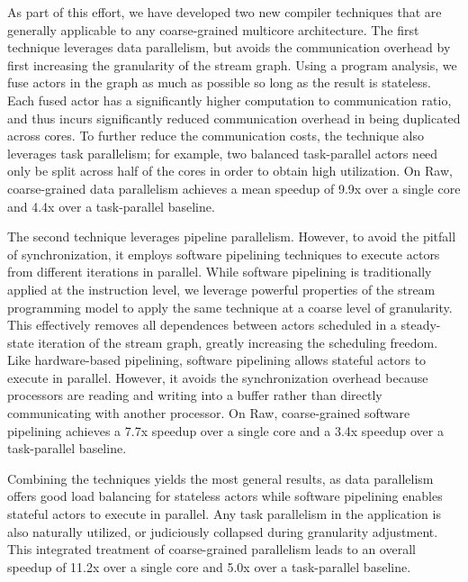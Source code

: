 As part of this effort, we have developed two new compiler techniques
that are generally applicable to any coarse-grained multicore
architecture.  The first technique leverages data parallelism, but
avoids the communication overhead by first increasing the granularity
of the stream graph.  Using a program analysis, we fuse actors in the
graph as much as possible so long as the result is stateless.  Each
fused actor has a significantly higher computation to communication
ratio, and thus incurs significantly reduced communication overhead in
being duplicated across cores.  To further reduce the communication
costs, the technique also leverages task parallelism; for example, two
balanced task-parallel actors need only be split across half of the
cores in order to obtain high utilization.  On Raw, coarse-grained
data parallelism achieves a mean speedup of 9.9x over a single core
and 4.4x over a task-parallel baseline.

The second technique leverages pipeline parallelism.  However, to
avoid the pitfall of synchronization, it employs software pipelining
techniques to execute actors from different iterations in parallel.
While software pipelining is traditionally applied at the instruction
level, we leverage powerful properties of the stream programming model
to apply the same technique at a coarse level of granularity.  This
effectively removes all dependences between actors scheduled in a
steady-state iteration of the stream graph, greatly increasing the
scheduling freedom.  Like hardware-based pipelining, software
pipelining allows stateful actors to execute in parallel.
However, it avoids the synchronization overhead because processors are
reading and writing into a buffer rather than directly communicating
with another processor.  On Raw, coarse-grained software pipelining
achieves a 7.7x speedup over a single core and a 3.4x speedup over a
task-parallel baseline.

Combining the techniques yields the most general results, as data
parallelism offers good load balancing for stateless actors while
software pipelining enables stateful actors to execute in parallel.
Any task parallelism in the application is also naturally utilized, or
judiciously collapsed during granularity adjustment.  This integrated
treatment of coarse-grained parallelism leads to an overall speedup of
11.2x over a single core and 5.0x over a task-parallel baseline.

